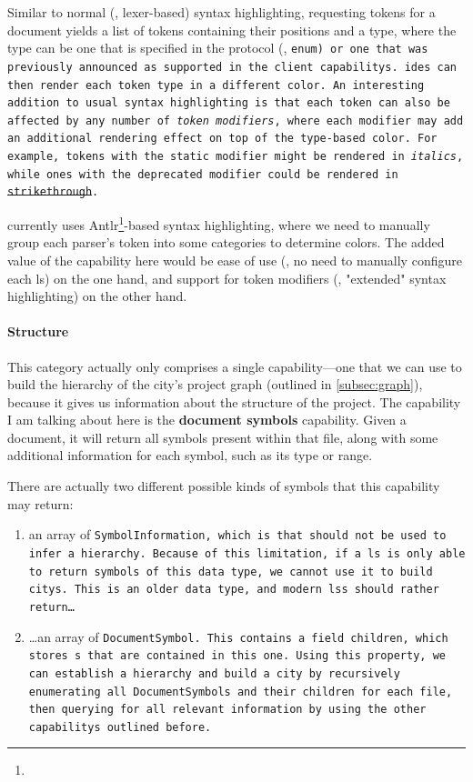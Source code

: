 \documentclass[../thesis]{subfiles}
\begin{document}
\begin{itemize}
	      Similar to normal (\eg, lexer-based) syntax highlighting, requesting \glspl{token} for a document yields a list of tokens containing their positions and a type, where the type can be one that is specified in the protocol (\eg, \tt{enum}) or one that was previously announced as supported in the client \glspl{capability}.
	      \glspl{ide} can then render each token type in a different color.
	      An interesting addition to usual syntax highlighting is that each token can also be affected by any number of \emph{token modifiers}, where each modifier may add an additional rendering effect on top of the type-based color.
	      For example, tokens with the \tt{static} modifier might be rendered in \textit{italics}, while ones with the \tt{deprecated} modifier could be rendered in \st{strikethrough}.

	      \SEE{} currently uses Antlr\footnote{}-based syntax highlighting, where we need to manually group each parser's token into some categories to determine colors.
	      The added value of the  \gls{capability} here would be ease of use (\ie, no need to manually configure each \gls{ls}) on the one hand, and support for token modifiers (\ie, "extended" syntax highlighting) on the other hand.
\end{itemize}


\paragraph{Structure}
This category actually only comprises a single \gls{capability}---one that we can use to build the hierarchy of the \gls{city}'s project graph (outlined in \cref{subsec:graph}), because it gives us information about the structure of the project.
The \gls{capability} I am talking about here is the \textbf{document symbols} \gls{capability}.
Given a document, it will return all symbols present within that file, along with some additional information for each symbol, such as its type or \gls{range}.

There are actually two different possible kinds of symbols that this \gls{capability} may return:
\begin{enumerate}
	\item an array of \tt{SymbolInformation}, which is  that should not be used to infer a hierarchy.
	      Because of this limitation, if a \gls{ls} is only able to return symbols of this data type, we cannot use it to build \glspl{city}.
	      This is an older data type, and modern \glspl{ls} should rather return\dots
	\item \dots{}an array of \tt{DocumentSymbol}.
	      This contains a field \tt{children}, which stores s that are contained in this one.
	      Using this property, we can establish a hierarchy and build a \gls{city} by recursively enumerating all \tt{DocumentSymbol}s and their children for each file, then querying for all relevant information by using the other \glspl{capability} outlined before.
\end{enumerate}
\end{document}
